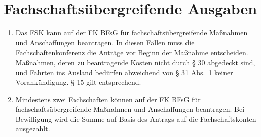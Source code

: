 \documentclass{article}
\begin{document}
\section{Fachschaftsübergreifende Ausgaben}
\begin{enumerate}[(1)]
    \item Das FSK kann auf der FK BFsG für fachschaftsübergreifende Maßnahmen und Anschaffungen beantragen. 
    	In diesen Fällen muss die Fachschaftenkonferenz die Anträge vor Beginn der Maßnahme entscheiden. 
    	Maßnahmen, deren zu beantragende Kosten nicht durch § 30 abgedeckt sind, und Fahrten ins Ausland bedürfen abweichend von § 31 Abs.\ 1 keiner Vorankündigung. 
    	§ 15 gilt entsprechend.
    \item Mindestens zwei Fachschaften können auf der FK BFsG für fachschaftsübergreifende Maßnahmen und Anschaffungen beantragen. 
    	Bei Bewilligung wird die Summe auf Basis des Antrags auf die Fachschaftskonten ausgezahlt.
\end{enumerate}
\end{document}
